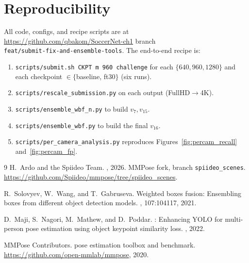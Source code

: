 \documentclass[10pt,twocolumn,letterpaper]{article}
\begin{document}
\section{Reproducibility}
\label{sec:repro}

All code, configs, and recipe scripts are at\\
\url{https://github.com/qbakom/SoccerNet-ch1} branch\\\texttt{feat/submit-fix-and-ensemble-tools}. The end-to-end recipe is:
\begin{enumerate}[leftmargin=*,topsep=2pt,itemsep=1pt]
    \item \texttt{scripts/submit.sh CKPT m 960 challenge} for each $\{640,960,1280\}$ and each checkpoint $\in\{$baseline, ft30$\}$ (six runs).
    \item \texttt{scripts/rescale\_submission.py} on each output (FullHD$\to$4K).
    \item \texttt{scripts/ensemble\_wbf\_n.py} to build $v_7, v_{15}$.
    \item \texttt{scripts/ensemble\_wbf.py} to build the final $v_{16}$.
    \item \texttt{scripts/per\_camera\_analysis.py} reproduces Figures~\ref{fig:percam_recall} and~\ref{fig:percam_fp}.
\end{enumerate}

\begin{thebibliography}{9}
\small
{}
H.~Ardo and the Spiideo Team.
, 2026.
\newblock MMPose fork, branch {\tt spiideo\_scenes}.
\newblock \url{https://github.com/Spiideo/mmpose/tree/spiideo_scenes}.

R.~Solovyev, W.~Wang, and T.~Gabruseva.
\newblock Weighted boxes fusion: Ensembling boxes from different object detection models.
, 107:104117, 2021.

D.~Maji, S.~Nagori, M.~Mathew, and D.~Poddar.
: Enhancing {YOLO} for multi-person pose estimation using object keypoint similarity loss.
, 2022.

{MMPose Contributors}.
 pose estimation toolbox and benchmark.
\newblock \url{https://github.com/open-mmlab/mmpose}, 2020.
\end{thebibliography}
\end{document}
